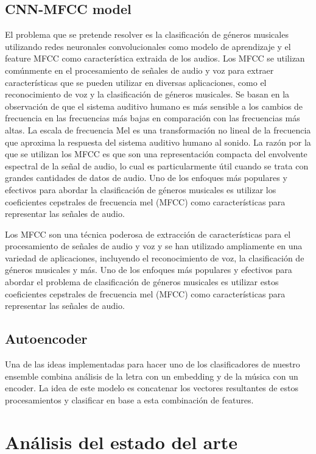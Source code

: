 \documentclass[colorinlistoftodos,twoside,twocolumn,10pt]{article} %
\begin{document}
\subsection {CNN-MFCC model}
El problema que se pretende resolver es la clasificaci\'on de g\'eneros musicales utilizando redes neuronales convolucionales como modelo de aprendizaje y el feature MFCC como caracter\'istica extraida de los audios.
Los MFCC se utilizan com\'unmente en el procesamiento de se\~nales de audio y voz para extraer caracter\'isticas que se pueden utilizar en diversas aplicaciones, como el reconocimiento de voz y la clasificaci\'on de g\'eneros musicales. Se basan en la observaci\'on de que el sistema auditivo humano es m\'as sensible a los cambios de frecuencia en las frecuencias m\'as bajas en comparaci\'on con las frecuencias m\'as altas. La escala de frecuencia Mel es una transformaci\'on no lineal de la frecuencia que aproxima la respuesta del sistema auditivo humano al sonido. La raz\'on por la que se utilizan los MFCC es que son una representaci\'on compacta del envolvente espectral de la se\~nal de audio, lo cual es particularmente \'util cuando se trata con grandes cantidades de datos de audio.
Uno de los enfoques m\'as populares y efectivos para abordar la clasificaci\'on de g\'eneros musicales es utilizar los coeficientes cepstrales de frecuencia mel (MFCC) como caracter\'isticas para representar las se\~nales de audio.

Los MFCC son una t\'ecnica poderosa de extracci\'on de caracter\'isticas para el procesamiento de se\~nales de audio y voz y se han utilizado ampliamente en una variedad de aplicaciones, incluyendo el reconocimiento de voz, la clasificaci\'on de g\'eneros musicales y m\'as.
Uno de los enfoques m\'as populares y efectivos para abordar el problema de clasificaci\'on de g\'eneros musicales es utilizar estos coeficientes cepstrales de frecuencia mel (MFCC) como caracter\'isticas para representar las se\~nales de audio.

\subsection {Autoencoder}
Una de las ideas implementadas para hacer uno de los clasificadores de nuestro ensemble combina an\'alisis de la letra con un embedding y de la m\'usica con un encoder. La idea de este modelo es concatenar los vectores resultantes de estos procesamientos y clasificar en base a esta combinaci\'on de features.


\section {An\'alisis del estado del arte}
\end{document}
